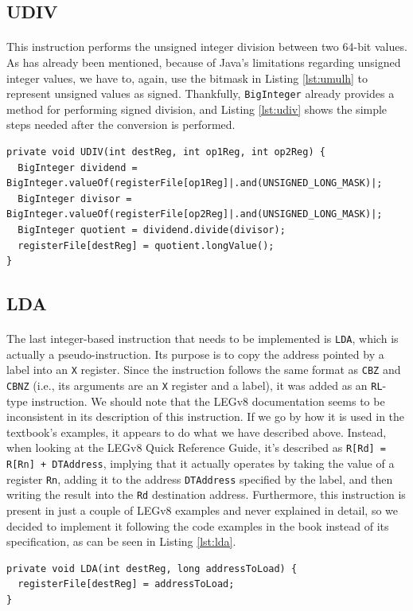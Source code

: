 \subsection{UDIV}
\paragraph{}
This instruction performs the unsigned integer division between two 64-bit values. As has already been mentioned, because of Java's limitations regarding unsigned integer values, we have to, again, use the bitmask in Listing \ref{lst:umulh} to represent unsigned values as signed. Thankfully, \verb|BigInteger| already provides a method for performing signed division, and Listing \ref{lst:udiv} shows the simple steps needed after the conversion is performed.
\begin{lstlisting}[float, caption={Implementation of the UDIV instruction}, label={lst:udiv}]
private void UDIV(int destReg, int op1Reg, int op2Reg) {
  BigInteger dividend = BigInteger.valueOf(registerFile[op1Reg]|.and(UNSIGNED_LONG_MASK)|;
  BigInteger divisor = BigInteger.valueOf(registerFile[op2Reg]|.and(UNSIGNED_LONG_MASK)|;
  BigInteger quotient = dividend.divide(divisor);
  registerFile[destReg] = quotient.longValue();
}
\end{lstlisting}
\subsection{LDA}
\paragraph{}
The last integer-based instruction that needs to be implemented is \verb|LDA|, which is actually a pseudo-instruction. Its purpose is to copy the address pointed by a label into an \verb|X| register. Since the instruction follows the same format as \verb|CBZ| and \verb|CBNZ| (i.e., its arguments are an \verb|X| register and a label), it was added as an \verb|RL|-type instruction. We should note that the LEGv8 documentation seems to be inconsistent in its description of this instruction. If we go by how it is used in the textbook's \cite{patterson2016computer} examples, it appears to do what we have described above. Instead, when looking at the LEGv8 Quick Reference Guide, it's described as \verb|R[Rd] = R[Rn] + DTAddress|, implying that it actually operates by taking the value of a register \verb|Rn|, adding it to the address \verb|DTAddress| specified by the label, and then writing the result into the \verb|Rd| destination address. Furthermore, this instruction is present in just a couple of LEGv8 examples and never explained in detail, so we decided to implement it following the code examples in the book instead of its specification, as can be seen in Listing \ref{lst:lda}.
\begin{lstlisting}[float, caption={Implementation of the LDA pseudo-instruction}, label={lst:lda}]
private void LDA(int destReg, long addressToLoad) {
  registerFile[destReg] = addressToLoad;
}
\end{lstlisting}
